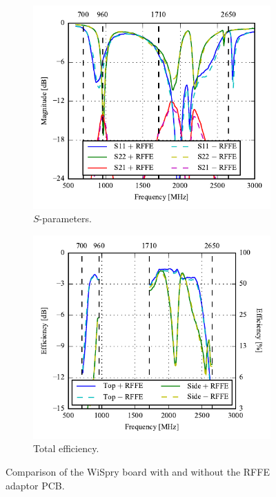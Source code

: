 \begin{figure}[htbp]
    \centering
    \begin{subfigure}[t]{0.49\linewidth}
        \includegraphics{img/optical_rffe/compare_sparams}
        \caption{$S$-parameters.} 
    \end{subfigure}
    \hfill
    \begin{subfigure}[t]{0.49\linewidth}
        \includegraphics{img/optical_rffe/compare_efficiency}
        \caption{Total efficiency.} 
    \end{subfigure}
    \caption{Comparison of the WiSpry board with and without the RFFE adaptor PCB.}
    \label{fig:rffe_test_results}
\end{figure}

